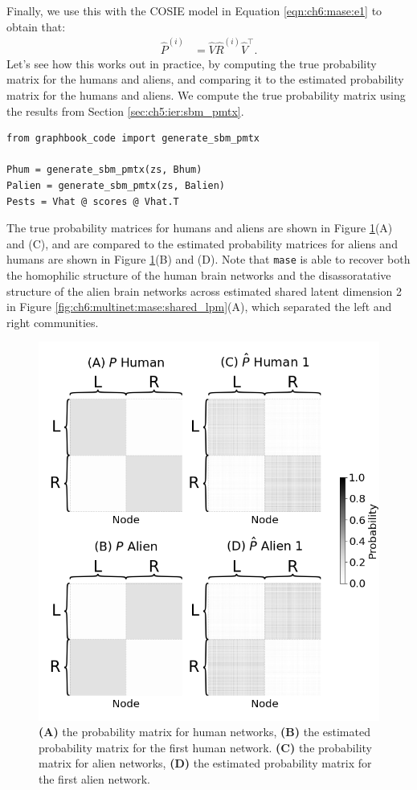 Finally, we use this with the COSIE model in Equation \eqref{eqn:ch6:mase:e1} to obtain that:
\begin{align*}
    \hat P^{(i)} &= \hat V \hat R^{(i)} \hat V^\top.
\end{align*}
Let's see how this works out in practice, by computing the true probability matrix for the humans and aliens, and comparing it to the estimated probability matrix for the humans and aliens. We compute the true probability matrix using the results from Section \ref{sec:ch5:ier:sbm_pmtx}.

\begin{lstlisting}[style=python]
from graphbook_code import generate_sbm_pmtx

Phum = generate_sbm_pmtx(zs, Bhum)
Palien = generate_sbm_pmtx(zs, Balien)
Pests = Vhat @ scores @ Vhat.T
\end{lstlisting}

The true probability matrices for humans and aliens are shown in Figure \ref{fig:ch6:multinet:mase:est_prob}(A) and (C), and are compared to the estimated probability matrices for aliens and humans are shown in Figure \ref{fig:ch6:multinet:mase:est_prob}(B) and (D). Note that \texttt{mase} is able to recover both the homophilic structure of the human brain networks and the disassoratative structure of the alien brain networks across estimated shared latent dimension 2 in Figure \ref{fig:ch6:multinet:mase:shared_lpm}(A), which separated the left and right communities. 

\begin{figure}[h]
    \centering
    \includegraphics[width=0.8\linewidth]{representations/ch6/Images/mase_probs.png}
    \caption[probability matrix estimates for \texttt{mase}]{\textbf{(A)} the probability matrix for human networks, \textbf{(B)} the estimated probability matrix for the first human network. \textbf{(C)} the probability matrix for alien networks, \textbf{(D)} the estimated probability matrix for the first alien network.}
    \label{fig:ch6:multinet:mase:est_prob}
\end{figure}

